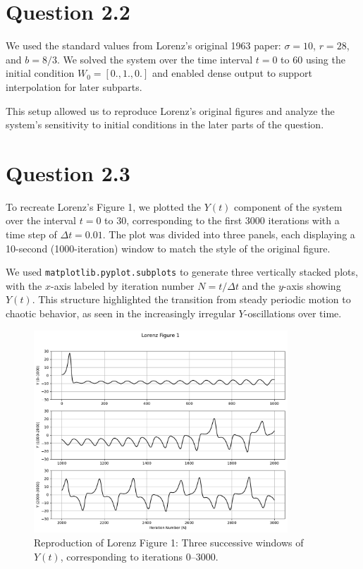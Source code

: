 \documentclass[11pt]{article}
\begin{document}
\section*{Question 2.2}

We used the standard values from Lorenz’s original 1963 paper: $\sigma = 10$, $r = 28$, and $b = 8/3$. We solved the system over the time interval $t = 0$ to $60$ using the initial condition $W_0 = [0., 1., 0.]$ and enabled dense output to support interpolation for later subparts.

This setup allowed us to reproduce Lorenz's original figures and analyze the system's sensitivity to initial conditions in the later parts of the question.

\section*{Question 2.3}

To recreate Lorenz’s Figure 1, we plotted the $Y(t)$ component of the system over the interval $t = 0$ to $30$, corresponding to the first 3000 iterations with a time step of $\Delta t = 0.01$. The plot was divided into three panels, each displaying a 10-second (1000-iteration) window to match the style of the original figure.

We used \texttt{matplotlib.pyplot.subplots} to generate three vertically stacked plots, with the $x$-axis labeled by iteration number $N = t / \Delta t$ and the $y$-axis showing $Y(t)$. This structure highlighted the transition from steady periodic motion to chaotic behavior, as seen in the increasingly irregular $Y$-oscillations over time.

\begin{figure}[H]
    \centering
    \includegraphics[width=0.85\textwidth]{fig2c.pdf}
    \caption{Reproduction of Lorenz Figure 1: Three successive windows of $Y(t)$, corresponding to iterations 0–3000.}
\end{figure}
\end{document}
